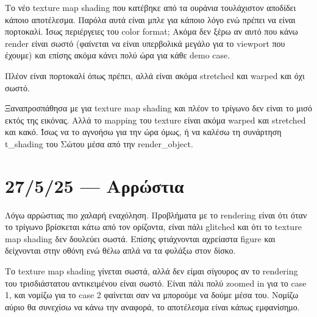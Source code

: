 \documentclass{article}
\begin{document}
Το νέο texture map shading που κατέβηκε από τα ουράνια τουλάχιστον
αποδίδει κάποιο αποτέλεσμα. Παρόλα αυτά είναι μπλε για κάποιο λόγο
ενώ πρέπει να είναι πορτοκαλί. Ίσως περιέργειες του color format;
Ακόμα δεν ξέρω αν αυτό που κάνω render είναι σωστό (φαίνεται να 
είναι υπερβολικά μεγάλο για το viewport που έχουμε) και επίσης ακόμα 
κάνει πολύ ώρα για κάθε demo case.

Πλέον είναι πορτοκαλί όπως πρέπει, αλλά είναι ακόμα stretched 
και warped και όχι σωστό.

Ξαναπροσπάθησα με για texture map shading και πλέον το τρίγωνο δεν είναι 
το μισό εκτός της εικόνας. Αλλά το mapping του texture είναι ακόμα 
warped και stretched και κακό. Ίσως να το αγνοήσω για την ώρα όμως,
ή να καλέσω τη συνάρτηση t\_shading του Σώτου μέσα από την render\_object.

\section{27/5/25 --- Αρρώστια}
Λόγω αρρώστιας πιο χαλαρή εναχόληση. Προβλήματα με το rendering
είναι ότι όταν το τρίγωνο βρίσκεται κάτω από τον ορίζοντα, είναι 
πάλι glitched και ότι το texture map shading δεν δουλεύει σωστά.
Επίσης φτιάχνονται αχρείαστα figure και δείχνονται στην οθόνη ενώ 
θέλω απλά να τα φυλάξω στον δίσκο.

Το texture map shading γίνεται σωστά, αλλά δεν είμαι σίγουρος αν το
rendering του τρισδιάστατου αντικειμένου είναι σωστό. Είναι πάλι 
πολύ zoomed in για το case 1, και νομίζω για το case 2 φαίνεται σαν να
μπορούμε να δούμε μέσα του. Νομίζω αύριο θα συνεχίσω να κάνω την αναφορά,
το αποτέλεσμα είναι κάπως εμφανίσημο.
\end{document}
